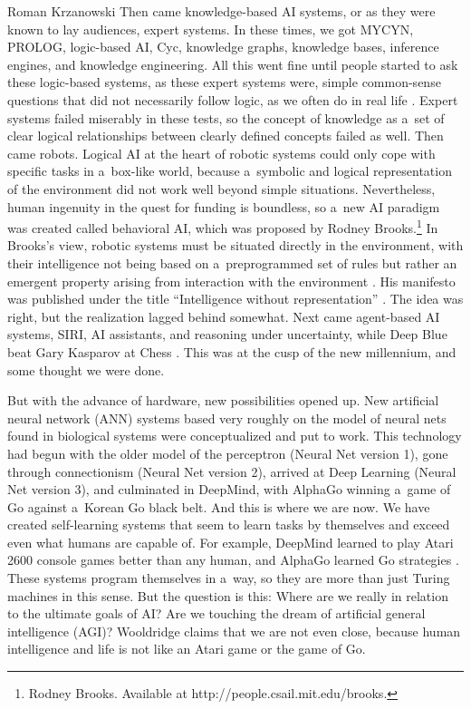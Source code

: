\begin{newrevengenv}{Roman Krzanowski}
Then came knowledge-based AI systems, or as they were known to lay audiences, expert systems. In these times, we got MYCYN, PROLOG, logic-based AI, Cyc, knowledge graphs, knowledge bases, inference engines, and knowledge engineering. All this went fine until people started to ask these logic-based systems, as these expert systems were, simple common-sense questions that did not necessarily follow logic, as we often do in real life
\parencite[][pp.89–123]{wooldridge_road_2021}.
Expert systems failed miserably in these tests, so the concept of knowledge as a~set of clear logical relationships between clearly defined concepts failed as well. Then came robots. Logical AI at the heart of robotic systems could only cope with specific tasks in a~box-like world, because a~symbolic and logical representation of the environment did not work well beyond simple situations. Nevertheless, human ingenuity in the quest for funding is boundless, so a~new AI paradigm was created called behavioral AI, which was proposed by Rodney Brooks.\footnote{Rodney Brooks. Available at http://people.csail.mit.edu/brooks.} In Brooks’s view, robotic systems must be situated directly in the environment, with their intelligence not being based on a~preprogrammed set of rules but rather an emergent property arising from interaction with the environment
\parencite[][pp.126–127]{wooldridge_road_2021}.
His manifesto was published under the title ``Intelligence without representation''
\parencite{brooks_intelligence_1991}.
The idea was right, but the realization lagged behind somewhat. Next came agent-based AI systems, SIRI, AI assistants, and reasoning under uncertainty, while Deep Blue beat Gary Kasparov at Chess
\parencite[][pp.125–165]{wooldridge_road_2021}.
This was at the cusp of the new millennium, and some thought we were done.

But with the advance of hardware, new possibilities opened up. New artificial neural network (ANN) systems based very roughly on the model of neural nets found in biological systems were conceptualized and put to work. This technology had begun with the older model of the perceptron (Neural Net version 1), gone through connectionism (Neural Net version 2), arrived at Deep Learning (Neural Net version 3), and culminated in DeepMind, with AlphaGo winning a~game of Go against a~Korean Go black belt. And this is where we are now. We have created self-learning systems that seem to learn tasks by themselves and exceed even what humans are capable of. For example, DeepMind learned to play Atari 2600 console games better than any human, and AlphaGo learned Go strategies
\parencite[][pp.167–210]{wooldridge_road_2021}.
These systems program themselves in a~way, so they are more than just Turing machines in this sense. But the question is this: Where are we really in relation to the ultimate goals of AI? Are we touching the dream of artificial general intelligence (AGI)? Wooldridge claims that we are not even close, because human intelligence and life is not like an Atari game or the game of Go.


\end{newrevengenv}
